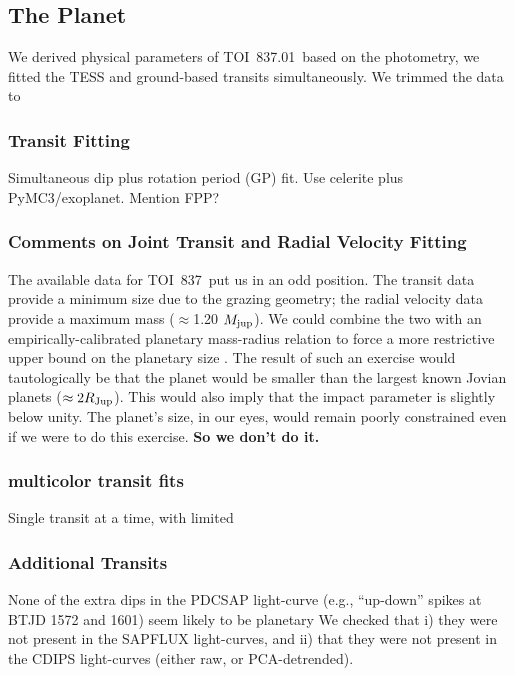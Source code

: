 \documentclass[12pt,twocolumn,tighten]{aastex63}
\newcommand{\tn}{TOI~837} %
\newcommand{\pn}{TOI~837.01} %
\begin{document}
\subsection{The Planet}
\label{subsec:planet}

We derived physical parameters of \pn\ based on the photometry, we
fitted the TESS and ground-based transits simultaneously.
We trimmed the data to 


\subsubsection{Transit Fitting}
Simultaneous dip plus rotation period (GP) fit. Use celerite plus PyMC3/exoplanet.
Mention FPP?


\subsubsection{Comments on Joint Transit and Radial Velocity Fitting}

The available data for \tn\ put us in an odd position. The transit
data provide a minimum size due to the grazing geometry; the radial
velocity data provide a maximum mass ($\approx$1.20 $M_{\rm jup}$).
We could combine the two with an empirically-calibrated planetary
mass-radius relation to force a more restrictive upper bound on the
planetary size \citep[{\it e.g.},][]{chen_probabilistic_2016}.  The
result of such an exercise would tautologically be that the planet
would be smaller than the largest known Jovian planets ($\approx
2R_{\rm Jup}$).  This would also imply that the impact parameter is
slightly below unity.  The planet's size, in our eyes, would remain
poorly constrained even if we were to do this exercise. {\bf So we
don't do it.}

\subsubsection{multicolor transit fits}
Single transit at a time, with limited


\subsubsection{Additional Transits}
None of the extra dips in the PDCSAP light-curve (e.g., ``up-down''
spikes at BTJD 1572 and 1601) seem likely to be planetary
We checked that i) they were not present in the SAPFLUX light-curves,
and ii) that they were not present in the CDIPS light-curves (either
raw, or PCA-detrended).
\end{document}
